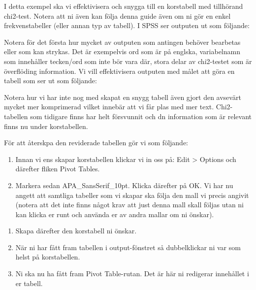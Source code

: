 \documentclass[
]{book}
\begin{document}
I detta exempel ska vi effektivisera och snygga till en korstabell med tillhörand chi2-test. Notera att ni även kan följa denna guide även om ni gör en enkel frekvenstabeller (eller annan typ av tabell). I SPSS ser outputen ut som följande:

Notera för det första hur mycket av outputen som antingen behöver bearbetas eller som kan strykas. Det är exempelvis ord som är på englska, variabelnamn som innehåller tecken/ord som inte bör vara där, stora delar av chi2-testet som är överflöding information. Vi vill effektivisera outputen med målet att göra en tabell som ser ut som följande:

Notera hur vi har inte nog med skapat en snygg tabell även gjort den avsevärt mycket mer komprimerad vilket innebär att vi får plas med mer text. Chi2-tabellen som tidigare finns har helt försvunnit och dn information som är relevant finns nu under korstabellen.

För att återskpa den reviderade tabellen gör vi som följande:

\begin{enumerate}
\def\labelenumi{\arabic{enumi}.}
\item
  Innan vi ens skapar korstabellen klickar vi in oss på: Edit \textgreater{} Options och därefter fliken Pivot Tables.
\item
  Markera sedan APA\_SansSerif\_10pt. Klicka därefter på OK. Vi har nu angett att samtliga tabeller som vi skapar ska följa den mall vi precis angivit (notera att det inte finns något krav att just denna mall skall följas utan ni kan klicka er runt och använda er av andra mallar om ni önskar).
\end{enumerate}

\begin{enumerate}
\def\labelenumi{\arabic{enumi}.}
\setcounter{enumi}{2}
\item
  Skapa därefter den korstabell ni önskar.
\item
  När ni har fått fram tabellen i output-fönstret så dubbelklickar ni var som helst på korstabellen.
\item
  Ni ska nu ha fått fram Pivot Table-rutan. Det är här ni redigerar innehållet i er tabell.
\end{enumerate}
\end{document}
